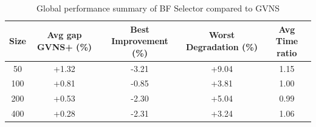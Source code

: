 \begin{table}[ht]
\centering
\footnotesize
\setlength{\tabcolsep}{4pt}
\caption{Global performance summary of BF Selector compared to GVNS}
\vspace{3mm}
\begin{tabular}{c c c c c}
\toprule
\textbf{Size} & \textbf{Avg gap GVNS+ (\%)} & \textbf{Best Improvement (\%)} & \textbf{Worst Degradation (\%)} & \textbf{Avg Time ratio} \\
\midrule
50  & +1.32 & -3.21 & +9.04  & 1.15 \\
100 & +0.81 & -0.85 & +3.81  & 1.00 \\
200 & +0.53 & -2.30 & +5.04  & 0.99 \\
400 & +0.28 & -2.31 & +3.24  & 1.06 \\
\bottomrule
\end{tabular}
\label{tab:bf_selector_summary}
\end{table}
